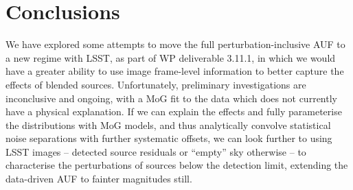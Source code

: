 \documentclass[fleqn,usenatbib]{mnras}
\begin{document}
\section{Conclusions}
We have explored some attempts to move the full perturbation-inclusive AUF to a new regime with LSST, as part of WP deliverable 3.11.1, in which we would have a greater ability to use image frame-level information to better capture the effects of blended sources. Unfortunately, preliminary investigations are inconclusive and ongoing, with a MoG fit to the data which does not currently have a physical explanation. If we can explain the effects and fully parameterise the distributions with MoG models, and thus analytically convolve statistical noise separations with further systematic offsets, we can look further to using LSST images -- detected source residuals or ``empty'' sky otherwise -- to characterise the perturbations of sources below the detection limit, extending the data-driven AUF to fainter magnitudes still.







\bsp	%
\label{lastpage}
\end{document}

